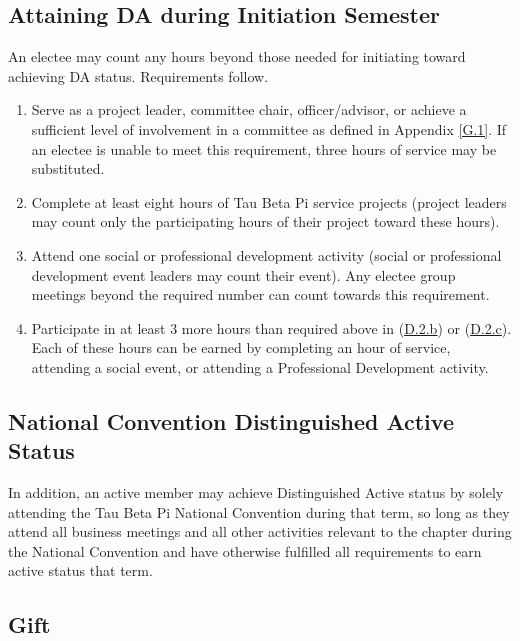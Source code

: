 \subsection{Attaining DA during Initiation Semester} \label{D.2}

An electee may count any hours beyond those needed for initiating toward achieving DA status. 
Requirements follow.
\begin{enumerate}
    \item {} %
    Serve as a project leader, committee chair, officer/advisor, or achieve
a sufficient level of involvement in a committee as defined in Appendix \ref{G.1}. If an
electee is unable to meet this requirement, three hours of service may be substituted.
    \item {}
    Complete at least eight hours of Tau Beta Pi service projects (project leaders
may count only the participating hours of their project toward these hours).
    \item {}
    Attend one social or professional development activity (social or professional
development event leaders may count their event). Any electee group meetings
beyond the required number can count towards this requirement.
    \item {} %
    Participate in at least 3 more hours than required above in (\hyperref[D.2.b]{D.2.b}) or (\hyperref[D.2.c]{D.2.c}).
Each of these hours can be earned by completing an hour of service, attending a
social event, or attending a Professional Development activity.
\end{enumerate}


\subsection{National Convention Distinguished Active Status} \label{D.3}

In addition,
an active member may achieve Distinguished Active status by solely attending the Tau
Beta Pi National Convention during that term, so long as they attend all business meetings
and all other activities relevant to the chapter during the National Convention and have
otherwise fulfilled all requirements to earn active status that term.


\subsection{Gift} \label{D.4}

